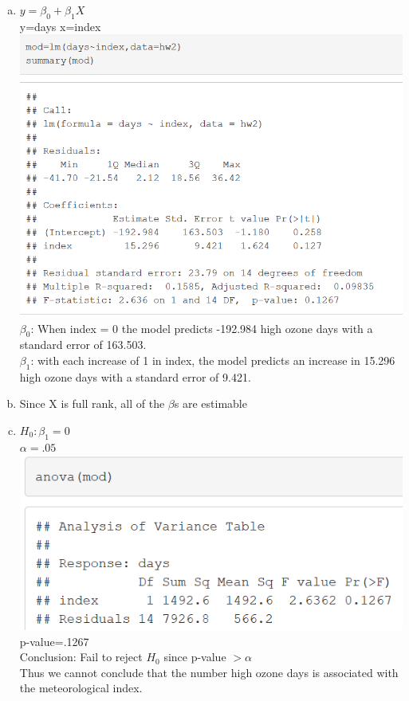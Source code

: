 \documentclass{article}
\newcommand{\B}{\beta}
\begin{document}
\begin{flushleft}
\begin{enumerate}[(a)]
	\item 
$y=\B_0+\B_1X$\\
y=days x=index\\
\includegraphics[scale=.8]{mod.png}\\
$\B_0$: When index = 0 the model predicts -192.984 high ozone days with a standard error of 163.503.\\
$\B_1$: with each increase of 1 in index, the model predicts an increase in 15.296 high ozone days with a standard error of 9.421. 
	\item 
Since X is full rank, all of the $\B$s are estimable\\
\pagebreak	
	\item 
$H_0:\B_1=0$\\
$\alpha=.05$\\
\includegraphics[scale=.7]{anova.png}\\
p-value=.1267\\
Conclusion: Fail to reject $H_0$ since p-value $>\alpha$\\
Thus we cannot conclude that the number high ozone days is associated with the meteorological index.

\end{enumerate}
\end{flushleft}
\end{document}
